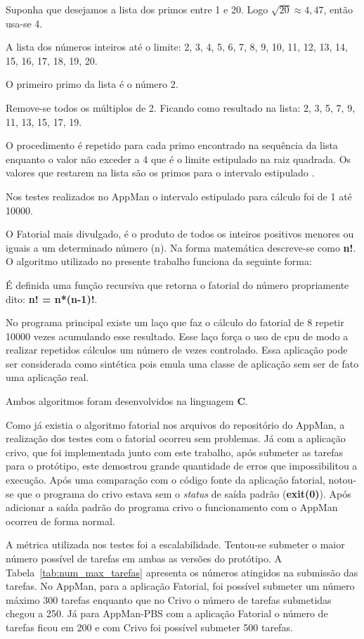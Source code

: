 Suponha que desejamos a lista dos primos entre 1 e 20. Logo $\sqrt{20} \approx 4,47$, então usa-se 4. 

A lista dos números inteiros até o limite: 2, 3, 4, 5, 6, 7, 8, 9, 10, 11, 12, 13, 14, 15, 16, 17, 18, 19, 20. 

O primeiro primo da lista é o número 2. 

Remove-se todos os múltiplos de 2. Ficando como resultado na lista: 2, 3, 5, 7, 9, 11, 13, 15, 17, 19.

O procedimento é repetido para cada primo encontrado na sequência da lista enquanto o valor não exceder a 4 que é o limite estipulado na raiz quadrada. Os valores que restarem na lista são os primos para o intervalo estipulado \cite{Ewerton2008}.

Nos testes realizados no AppMan o intervalo estipulado para cálculo foi de 1 até 10000.

O Fatorial mais divulgado, é o produto de todos os inteiros positivos menores ou iguais a um determinado número (n). Na forma matemática descreve-se como \textbf{n!}. O algoritmo utilizado no presente trabalho funciona da seguinte forma:

É definida uma função recursiva que retorna o fatorial do número propriamente dito: {\bf n! = n*(n-1)!}.

No programa principal existe um laço que faz o cálculo do fatorial de 8 repetir 10000 vezes acumulando esse resultado. Esse laço força o uso de cpu de modo a realizar repetidos cálculos um número de vezes controlado. Essa aplicação pode ser considerada como sintética pois emula uma classe de aplicação sem ser de fato uma aplicação real.

Ambos algoritmos foram desenvolvidos na linguagem \textbf{C}.

Como já existia o algoritmo fatorial nos arquivos do repositório do AppMan, a realização dos testes com o fatorial ocorreu sem problemas. Já com a aplicação crivo, que foi implementada junto com este trabalho, após submeter as tarefas para o protótipo, este demostrou grande quantidade de erros que impossibilitou a execução. Após uma comparação com o código fonte da aplicação fatorial, notou-se que o programa do crivo estava sem o \emph{status} de saída padrão (\textbf{exit(0)}). Após adicionar a saída padrão do programa crivo o funcionamento com o AppMan ocorreu de forma normal.

A métrica utilizada nos testes foi a escalabilidade. Tentou-se submeter o maior número possível de tarefas em ambas as versões do protótipo. A Tabela~\ref{tab:num_max_tarefas} apresenta os números atingidos na submissão das tarefas. No AppMan, para a aplicação Fatorial, foi possível submeter um número máximo 300 tarefas enquanto que no Crivo o número de tarefas submetidas chegou a 250. Já para AppMan-PBS com a aplicação Fatorial o número de tarefas ficou em 200 e com Crivo foi possível submeter 500 tarefas.

